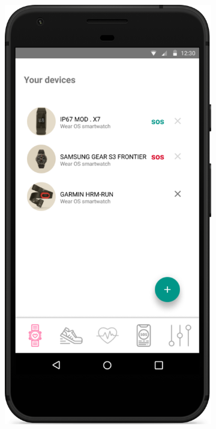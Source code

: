 \documentclass[../main.tex]{subfiles}
\begin{document}
\begin{figure}[H]
	\centering
	\begin{subfigure}[b]{0.45\linewidth}
		\includegraphics[width=\linewidth]{images/mockup/UserDevices.png}

\end{subfigure}
\end{figure}
\end{document}
